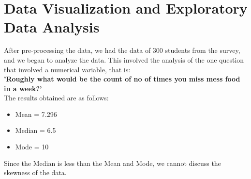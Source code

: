 \documentclass{article}
\begin{document}
\section{Data Visualization and Exploratory Data Analysis}
After pre-processing the data, we had the data of 300 students from the survey, and we began to analyze the data. This involved the analysis of the one question that involved a numerical variable, that is:\\
\textbf{'Roughly what would be the count of no of times you miss mess food in a week?'}\\
The results obtained are as follows:
\begin{itemize}
    \item Mean = 7.296
    \item Median = 6.5
    \item Mode = 10
\end{itemize}
Since the Median is less than the Mean and Mode, we cannot discuss the skewness of the data.
\end{document}
